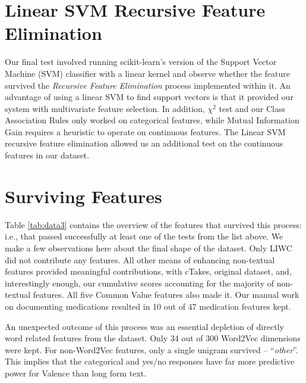 \section{Linear SVM Recursive Feature Elimination}
Our final test involved running \textsf{scikit-learn}'s version
of the Support Vector Machine (SVM) classifier with
a linear kernel \cite{cortes95} and observe whether the feature survived the
\textit{Recursive Feature Elimination} process implemented
within it. An advantage of using a linear SVM to find support vectors is that 
it provided our system with multivariate feature selection.
In addition, $\chi^2$ test and our Class Association Rules only worked on categorical features, 
while Mutual Information Gain requires a heuristic \cite{Xu07} to operate on continuous features.
The Linear SVM recursive feature elimination allowed us an additional test on
the continuous features in our dataset.

\section{Surviving Features}

Table \ref{tab:data3} contains the overview of the features that
survived this process: i.e., that passed successfully at least one of
the tests from the list above. We make a few observations here
about the final shape of the dataset. Only \textsf{LIWC} did
not contribute any features. All other means of enhancing
non-textual features provided meaningful contributions, 
with \textsf{cTakes}, original dataset, and, interestingly
enough, our cumulative scores accounting for the
majority of non-textual features.  All five \textsf{Common Value}
features also made it. Our manual work on documenting
medications resulted in 10 out of 47 medication
features kept. 

An unexpected outcome of 
this process was an essential depletion of directly word related
features from the dataset. Only 34 out of 300 Word2Vec dimensions were kept. For non-Word2Vec features, only a single unigram survived -- ``\textit{other}''. 
This implies that the categorical and yes/no responses have far more predictive power for Valence than long form text.

